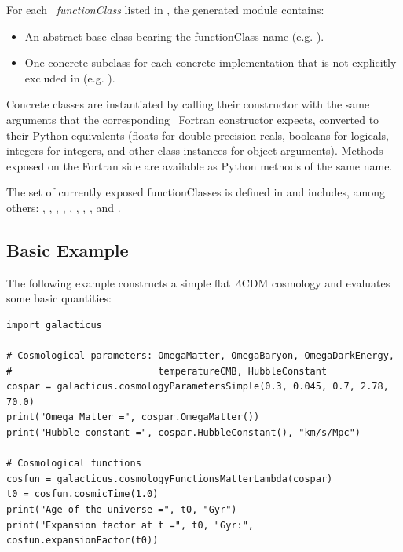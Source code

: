 For each \glc\ \emph{functionClass} listed in , the generated module contains:
\begin{itemize}
  \item An abstract base class bearing the functionClass name (e.g. ).
  \item One concrete subclass for each concrete implementation that is not explicitly excluded in  (e.g. ).
\end{itemize}
Concrete classes are instantiated by calling their constructor with the same arguments that the corresponding \glc\ Fortran constructor expects, converted to their Python equivalents (floats for double-precision reals, booleans for logicals, integers for integers, and other class instances for object arguments). Methods exposed on the Fortran side are available as Python methods of the same name.

The set of currently exposed functionClasses is defined in  and includes, among others: , , , , , , , , and .

\subsection{Basic Example}\label{sec:pythonInterface:usage:example}

The following example constructs a simple flat $\Lambda$CDM cosmology and evaluates some basic quantities:
\begin{verbatim}
import galacticus

# Cosmological parameters: OmegaMatter, OmegaBaryon, OmegaDarkEnergy,
#                          temperatureCMB, HubbleConstant
cospar = galacticus.cosmologyParametersSimple(0.3, 0.045, 0.7, 2.78, 70.0)
print("Omega_Matter =", cospar.OmegaMatter())
print("Hubble constant =", cospar.HubbleConstant(), "km/s/Mpc")

# Cosmological functions
cosfun = galacticus.cosmologyFunctionsMatterLambda(cospar)
t0 = cosfun.cosmicTime(1.0)
print("Age of the universe =", t0, "Gyr")
print("Expansion factor at t =", t0, "Gyr:", cosfun.expansionFactor(t0))
\end{verbatim}

